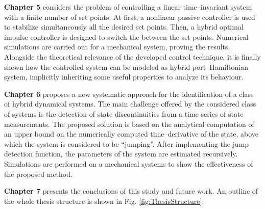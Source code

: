 %
\textbf{Chapter 5} considers the problem of controlling a linear time--invariant system with a finite number of set points. At first, a nonlinear passive controller is used to stabilize simultaneously all the desired set points. Then, a hybrid optimal impulse controller is designed to switch the between the set points. Numerical simulations are carried out for a mechanical system, proving the results. Alongside the theoretical relevance of the developed control technique, it is finally shown how the controlled system can be modeled as hybrid port--Hamiltonian system, implicitly inheriting some useful properties to analyze its behaviour.
%
\newline

%
\textbf{Chapter 6} proposes a new systematic approach for the identification of a class of hybrid dynamical systems. The main challenge offered by the considered class of systems is the detection of state discontinuities from a time series of state measurements. The proposed solution is based on the analytical computation of an upper bound on the numerically computed time--derivative of the state, above which the system is considered to be ``jumping''. After implementing the jump detection function, the parameters of the system are estimated recursively. Simulations are performed on a mechanical systems to show the effectiveness of the proposed method.
\newline

%
\textbf{Chapter 7} presents the conclusions of this study and future work. An outline of the whole thesis structure is shown in Fig. \ref{fig:ThesisStructure}.

